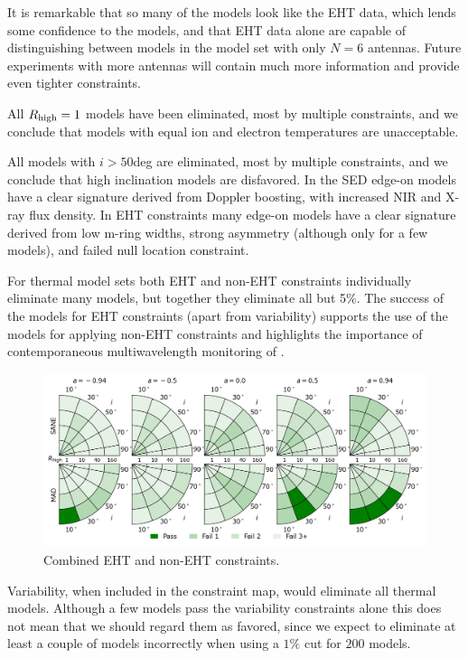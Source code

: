 It is remarkable that so many of the models look like the EHT data, which lends some  confidence to the models, and that EHT data alone are capable of distinguishing between models in the model set with only $N = 6$ antennas.  Future experiments with more antennas will contain much more information and provide even tighter constraints.

All $R_\mathrm{high} = 1$ models have been eliminated, most by multiple constraints, and we conclude that models with equal ion and electron temperatures are unacceptable.

All models with $i > 50$deg are eliminated, most by multiple constraints, and we conclude that high inclination models are disfavored.  In the SED edge-on models have a clear signature derived from Doppler boosting, with increased NIR and X-ray flux density.  In EHT constraints many edge-on models have a clear signature derived from low m-ring widths, strong asymmetry (although only for a few models), and failed null location constraint.

For thermal model sets both EHT and non-EHT constraints individually eliminate many models, but together they eliminate all but 5\%.  The success of the models for EHT constraints (apart from variability) supports the use of the models for applying non-EHT constraints and highlights the importance of contemporaneous multiwavelength monitoring of \sgra.

\begin{figure}
  \centering
  \includegraphics[width=\textwidth]{./figures/All_Constraints.png}
  \caption{Combined EHT and non-EHT constraints.}
  \label{fig:all_cuts}
\end{figure}

Variability, when included in the constraint map, would eliminate all thermal models.  Although a few models pass the variability constraints alone this does not mean that we should regard them as favored, since we expect to eliminate at least a couple of models incorrectly when using a $1\%$ cut for $200$ models.

